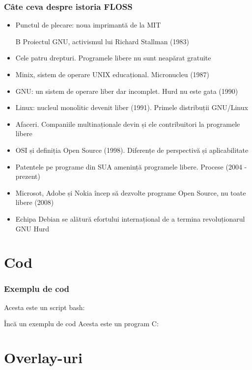 \documentclass{beamer}
\begin{document}
\begin{frame}[allowframebreaks] %
  \frametitle{Câte ceva despre istoria FLOSS}
  \begin{itemize}
  \item Punctul de plecare: noua imprimantă de la MIT
  \begin{block}{B}
  Proiectul GNU, activismul lui Richard Stallman (1983)
  \end{block}
  \item Cele patru drepturi. Programele libere nu sunt neapărat gratuite
  \item Minix, sistem de operare UNIX educațional. Micronucleu (1987)
  \item GNU: un sistem de operare liber dar incomplet. Hurd nu este gata (1990)
  \item Linux: nucleul monolitic devenit liber (1991). Primele distribuții
    GNU/Linux
  \item Afaceri. Companiile multinaționale devin și ele contribuitori la
    programele libere
  \item OSI și definiția Open Source (1998). Diferențe de perspectivă și
    aplicabilitate
  \item Patentele pe programe din SUA amenință programele libere. Procese (2004
    - prezent)
  \item Microsot, Adobe și Nokia încep să dezvolte programe Open Source, nu
    toate libere (2008)
  \item Echipa Debian se alătură efortului internațional de a termina
    revoluționarul GNU Hurd
  \end{itemize}
\end{frame}

\section{Cod}

\begin{frame}
  \frametitle{Exemplu de cod}
  Acesta este un script bash:\\
\end{frame}

\begin{frame}{Încă un exemplu de cod}
  Acesta este un program C:

\end{frame}

\section{Overlay-uri}
\end{document}
